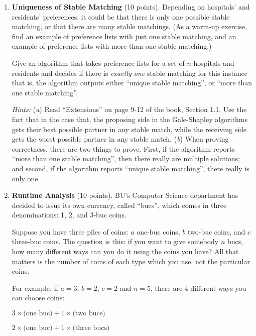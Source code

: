 \documentclass[11pt]{article}
\begin{document}
\begin{enumerate}
    \item \textbf{Uniqueness of Stable Matching} (10 points).
   	Depending on hospitals' and residents' preferences, it could be that there is only one possible stable matching, or that there are many stable matchings. (As a warm-up exercise, find an example of preference lists with just one stable matching, and an example of preference lists with more than one stable matching.)
    
	Give an algorithm that takes preference lists for a set of $n$ hospitals and residents and decides if there is {\em exactly
          one} stable matching for this instance that is, the algorithm
        outputs either ``unique stable matching'', or ``more than one
        stable matching''.
        
     
        {\footnotesize \emph{Hints:} (\emph{a}) Read ``Extensions'' on page 9-12 of the book, Section 1.1. Use the fact that in the case that, the proposing side in the Gale-Shapley algorithms gets their best possible partner in any stable match, while the receiving side gets the worst possible partner in any stable match. 
        (\emph{b}) When proving correctness, there are two things to prove. First, if the algorithm reports ``more than one
        stable matching'', then there really are multiple solutions; and second, if the algorithm reports ``unique stable matching'', there really is only one. }
        
    
    

    \item \textbf{Runtime Analysis} (10 points). BU's Computer Science department has decided to issue its own currency, called ``bucs'',  which comes in three denominations: 1, 2, and 3-buc coins. 
    
    Suppose you have three piles of coins: $a$ one-buc coins, $b$ two-buc coins, and $c$ three-buc coins. The question is this: if you want to give somebody $n$ bucs, how many different ways can you do it using the coins you have? All that matters is the number of coins of each type which you use, not the particular coins. 
    
    For example, if $a=3$, $b=2$, $c=2$  and $n=5$, there are 4 different ways you can choose coins: 

    {\footnotesize $ 3 \times \text{(one buc)} + 1 \times   \text{(two bucs)} $

    $ 2 \times \text{(one buc)} + 1 \times   \text{(three bucs)}$    

}
\end{enumerate}
\end{document}
